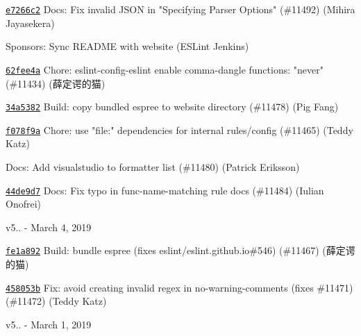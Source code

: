 \begin{DoxyItemize}
\item \href{https://github.com/eslint/eslint/commit/e7266c2478aff5d66e7859313feb49e3a129f85e}{\texttt{ {\ttfamily e7266c2}}} Docs\+: Fix invalid JSON in "{}\+Specifying Parser Options"{} (\#11492) (Mihira Jayasekera)
\item \href{https://github.com/eslint/eslint/commit/6693161978a83e0730d5ea0fecdb627c5a2acdfd}{\texttt{ {}}} Sponsors\+: Sync README with website (ESLint Jenkins)
\item \href{https://github.com/eslint/eslint/commit/62fee4a976897d158c8c137339728cd280333286}{\texttt{ {\ttfamily 62fee4a}}} Chore\+: eslint-\/config-\/eslint enable comma-\/dangle functions\+: "{}never"{} (\#11434) (薛定谔的猫)
\item \href{https://github.com/eslint/eslint/commit/34a53829e7a63ff2f6b371d77ce283bbdd373b91}{\texttt{ {\ttfamily 34a5382}}} Build\+: copy bundled espree to website directory (\#11478) (Pig Fang)
\item \href{https://github.com/eslint/eslint/commit/f078f9a9e094ec00c61a6ef1c9550d017631e69a}{\texttt{ {\ttfamily f078f9a}}} Chore\+: use "{}file\+:"{} dependencies for internal rules/config (\#11465) (Teddy Katz)
\item \href{https://github.com/eslint/eslint/commit/075612871f85aa04cef8137bd32247e128ad600b}{\texttt{ {}}} Docs\+: Add {\ttfamily visualstudio} to formatter list (\#11480) (Patrick Eriksson)
\item \href{https://github.com/eslint/eslint/commit/44de9d7e1aa2fcae475a97b8f597b7d8094566b2}{\texttt{ {\ttfamily 44de9d7}}} Docs\+: Fix typo in func-\/name-\/matching rule docs (\#11484) (Iulian Onofrei)
\end{DoxyItemize}

v5.. -\/ March 4, 2019


\begin{DoxyItemize}
\item \href{https://github.com/eslint/eslint/commit/fe1a892f85b09c3d2fea05bef011530a678a6af5}{\texttt{ {\ttfamily fe1a892}}} Build\+: bundle espree (fixes eslint/eslint.\+github.\+io\#546) (\#11467) (薛定谔的猫)
\item \href{https://github.com/eslint/eslint/commit/458053b0b541f857bf233dacbde5ba80681820f8}{\texttt{ {\ttfamily 458053b}}} Fix\+: avoid creating invalid regex in no-\/warning-\/comments (fixes \#11471) (\#11472) (Teddy Katz)
\end{DoxyItemize}

v5.. -\/ March 1, 2019


